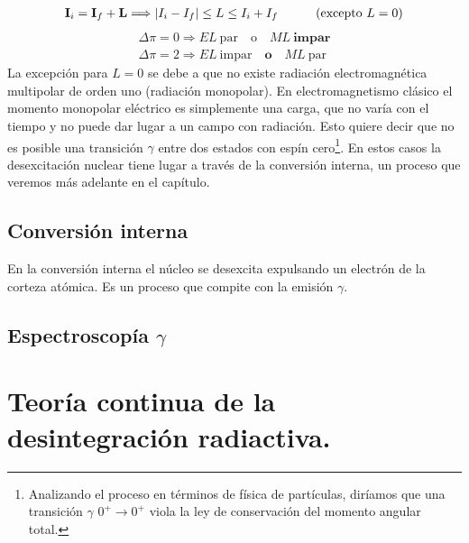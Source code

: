 \begin{eqnarray}
	\mathbf{I}_i = \mathbf{I}_f + \mathbf{L} \Longrightarrow |I_i -I_f|\leq L\leq I_i + I_f \quad \quad \quad (\text{excepto} \ L=0)
\end{eqnarray}
\begin{eqnarray*}
 	\Delta \pi = 0 \Longrightarrow EL \ \text{par} \quad \text{o} \quad M L  \ \textbf{impar} \\ 	
 	\Delta \pi = 2 \Longrightarrow EL \ \text{impar} \quad \textbf{o} \quad ML \ \text{par}
\end{eqnarray*} 
La excepción para $L=0$ se debe a que no existe radiación electromagnética multipolar de orden uno (radiación monopolar). En electromagnetismo clásico el momento monopolar eléctrico es simplemente una carga, que no varía con el tiempo y no puede dar lugar a un campo con radiación. Esto quiere decir que no es posible una transición $\gamma$ entre dos estados con espín cero\footnote{Analizando el proceso en términos de física de partículas, diríamos que una transición $\gamma$ $0^+ \rightarrow 0^+$ viola la ley de conservación del momento angular total.}. En estos casos la desexcitación nuclear tiene lugar a través de la conversión interna, un proceso que veremos más adelante en el capítulo.

\subsection{Conversión interna}

En la conversión interna el núcleo se desexcita expulsando un electrón de la corteza atómica. Es un proceso que compite con la emisión $\gamma$.


\subsection{Espectroscopía $\gamma$}


\section{Teoría continua de la desintegración radiactiva.}

